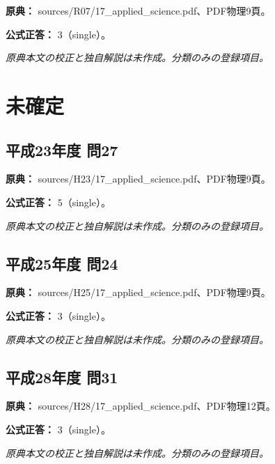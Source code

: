 \noindent\textbf{原典：} sources/R07/17\_applied\_science.pdf、PDF物理9頁。

\textbf{公式正答：} 3（single）。

\par\textit{原典本文の校正と独自解説は未作成。分類のみの登録項目。}

\section{未確定}

\subsection{平成23年度 問27}
\label{q:h23-reg-applied-27}

\noindent\textbf{原典：} sources/H23/17\_applied\_science.pdf、PDF物理9頁。

\textbf{公式正答：} 5（single）。

\par\textit{原典本文の校正と独自解説は未作成。分類のみの登録項目。}

\subsection{平成25年度 問24}
\label{q:h25-reg-applied-24}

\noindent\textbf{原典：} sources/H25/17\_applied\_science.pdf、PDF物理9頁。

\textbf{公式正答：} 3（single）。

\par\textit{原典本文の校正と独自解説は未作成。分類のみの登録項目。}

\subsection{平成28年度 問31}
\label{q:h28-reg-applied-31}

\noindent\textbf{原典：} sources/H28/17\_applied\_science.pdf、PDF物理12頁。

\textbf{公式正答：} 3（single）。

\par\textit{原典本文の校正と独自解説は未作成。分類のみの登録項目。}
